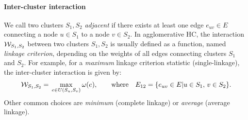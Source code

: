 \paragraph{Inter-cluster interaction}\label{par:linkage_criterion_def} We call two clusters $S_1,S_2$ \emph{adjacent} if there exists at least one edge ${e_{uv}\in E}$ connecting a node $u\in S_1$ to a node $v\in S_2$. In agglomerative HC, the interaction $\mathcal{W}_{S_1,S_2}$ between two clusters $S_1, S_2$ is usually defined as a function, named \emph{linkage criterion}, depending on the weights of all edges connecting clusters $S_1$ and $S_2$. For example, for a \emph{maximum} linkage criterion statistic (single-linkage), the inter-cluster interaction is given by:
\begin{equation}\label{eq:max_linkage}
\mathcal{W}_{S_1,S_2} = \, \max_{e\in U(S_u,S_v)} \omega(e), \qquad \text{where}\quad E_{12} = \{ e_{uv} \in E | u \in S_1, \, v \in S_2 \}.
\end{equation}
Other common choices are \emph{minimum} (complete linkage) or \emph{average} (average linkage). %

